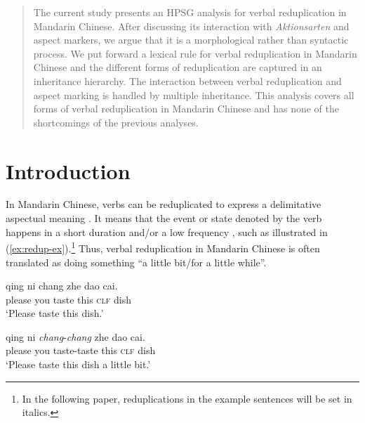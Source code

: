\documentclass[11pt,a4paper,fleqn,draft]{article}
\let\textbf\emph
\begin{document}


\begin{abstract}

The current study presents an HPSG analysis for verbal reduplication in Mandarin Chinese. 
After discussing its interaction with \emph{Aktionsarten} and aspect markers, 
we argue that it is a morphological rather than syntactic process.
We put forward a lexical rule for verbal reduplication in Mandarin Chinese
and the different forms of reduplication are captured in an inheritance hierarchy.
The interaction between verbal reduplication and aspect marking is handled by multiple inheritance.
This analysis covers all forms of verbal reduplication in Mandarin Chinese 
and has none of the shortcomings of the previous analyses.

\end{abstract}



\section{Introduction}\label{ch:intro}

In Mandarin Chinese, verbs can be reduplicated to express a delimitative aspectual meaning \citep[e.g.][]{Chao1968, Chen2001, Dai1997, Li1996, LiThompson1981, Tsao2001, XiaoMcEnery2004, Yang2003, Zhu1998}. 
It means that the event or state denoted by the verb happens in a short duration and/or a low
frequency \citep[155]{XiaoMcEnery2004}, such as illustrated in (\ref{ex:redup-ex}).\footnote{In the
  following paper, reduplications in the example sentences will be set in italics.}
Thus, verbal reduplication in Mandarin Chinese is often translated as doing something ``a little bit/for a little while”.

\ea\label{ex:redup-ex} 
	\ea
	\gll qing ni chang zhe dao cai.\\
	please you taste this \textsc{clf} dish\\
	\glt `Please taste this dish.'
	
	\ex
	\gll qing ni \textbf{chang}-\textbf{chang} zhe dao cai.\\
	please you taste-taste this \textsc{clf} dish\\
	\glt `Please taste this dish a little bit.' 
	\z
\z
\end{document}
